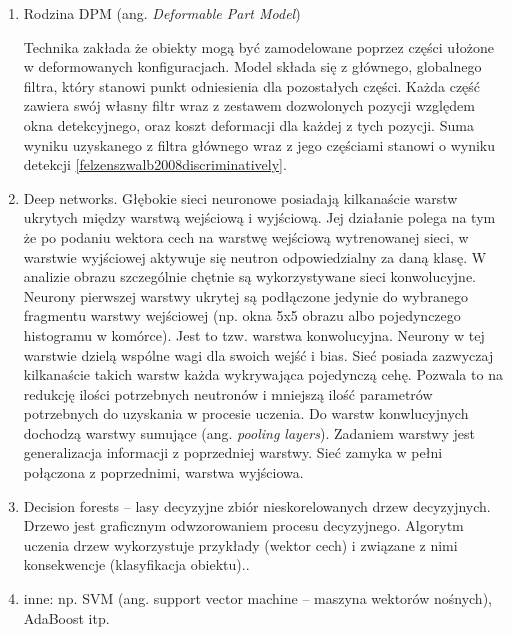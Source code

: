 \begin{enumerate}
\item Rodzina DPM (ang. \textit{Deformable Part Model}) 

Technika zakłada że obiekty mogą być zamodelowane poprzez części ułożone w deformowanych konfiguracjach. Model składa się z głównego, globalnego filtra, który stanowi punkt odniesienia dla pozostałych części. Każda część zawiera swój własny filtr wraz z zestawem dozwolonych pozycji względem okna detekcyjnego, oraz koszt deformacji dla każdej z tych pozycji. Suma wyniku uzyskanego z filtra głównego wraz z jego częściami stanowi o wyniku detekcji \ref{felzenszwalb2008discriminatively}.

\item Deep networks.
Głębokie sieci neuronowe posiadają kilkanaście warstw ukrytych między warstwą wejściową i wyjściową. Jej działanie polega na tym że po podaniu wektora cech na warstwę wejściową wytrenowanej sieci, w warstwie wyjściowej aktywuje się neutron odpowiedzialny za daną klasę. W analizie obrazu szczególnie chętnie są wykorzystywane sieci konwolucyjne. Neurony pierwszej warstwy ukrytej są podłączone jedynie do wybranego fragmentu warstwy wejściowej (np. okna 5x5 obrazu albo pojedynczego histogramu w komórce). Jest to tzw. warstwa konwolucyjna. Neurony w tej warstwie dzielą wspólne wagi dla swoich wejść i bias. Sieć posiada zazwyczaj kilkanaście takich warstw każda wykrywająca pojedynczą cehę. Pozwala to na redukcję ilości potrzebnych neutronów i mniejszą ilość parametrów potrzebnych do uzyskania w procesie uczenia. Do warstw konwlucyjnych dochodzą warstwy sumujące (ang. \textit{pooling layers}). Zadaniem warstwy jest generalizacja informacji z poprzedniej warstwy. Sieć zamyka w pełni połączona z poprzednimi, warstwa wyjściowa.

\item Decision forests –  lasy decyzyjne zbiór nieskorelowanych drzew decyzyjnych. Drzewo jest graficznym odwzorowaniem procesu decyzyjnego. Algorytm uczenia drzew wykorzystuje przykłady (wektor cech) i związane z nimi konsekwencje (klasyfikacja obiektu).\cite{wikiedia}. 

\item inne:  np. SVM (ang. support vector machine – maszyna wektorów nośnych), AdaBoost itp.


\end{enumerate}





